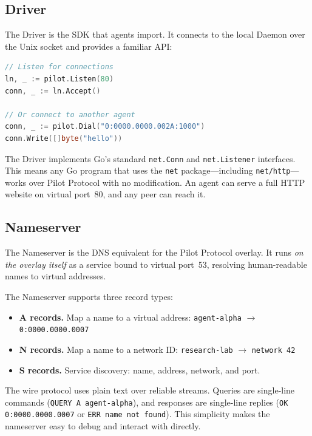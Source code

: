\documentclass[11pt,a4paper]{article}
\begin{document}
\subsection{Driver}

The Driver is the SDK that agents import. It connects to the local Daemon over the Unix socket and provides a familiar API:

\begin{lstlisting}[language=Go]
// Listen for connections
ln, _ := pilot.Listen(80)
conn, _ := ln.Accept()

// Or connect to another agent
conn, _ := pilot.Dial("0:0000.0000.002A:1000")
conn.Write([]byte("hello"))
\end{lstlisting}

The Driver implements Go's standard \texttt{net.Conn} and \texttt{net.Listener} interfaces. This means any Go program that uses the \texttt{net} package---including \texttt{net/http}---works over Pilot Protocol with no modification. An agent can serve a full HTTP website on virtual port~80, and any peer can reach it.

\subsection{Nameserver}

The Nameserver is the DNS equivalent for the Pilot Protocol overlay. It runs \emph{on the overlay itself} as a service bound to virtual port~53, resolving human-readable names to virtual addresses.

The Nameserver supports three record types:

\begin{itemize}
    \item \textbf{A records.} Map a name to a virtual address: \texttt{agent-alpha} $\rightarrow$ \texttt{0:0000.0000.0007}
    \item \textbf{N records.} Map a name to a network ID: \texttt{research-lab} $\rightarrow$ \texttt{network 42}
    \item \textbf{S records.} Service discovery: name, address, network, and port.
\end{itemize}

The wire protocol uses plain text over reliable streams. Queries are single-line commands (\texttt{QUERY A agent-alpha}), and responses are single-line replies (\texttt{OK 0:0000.0000.0007} or \texttt{ERR name not found}). This simplicity makes the nameserver easy to debug and interact with directly.
\end{document}
